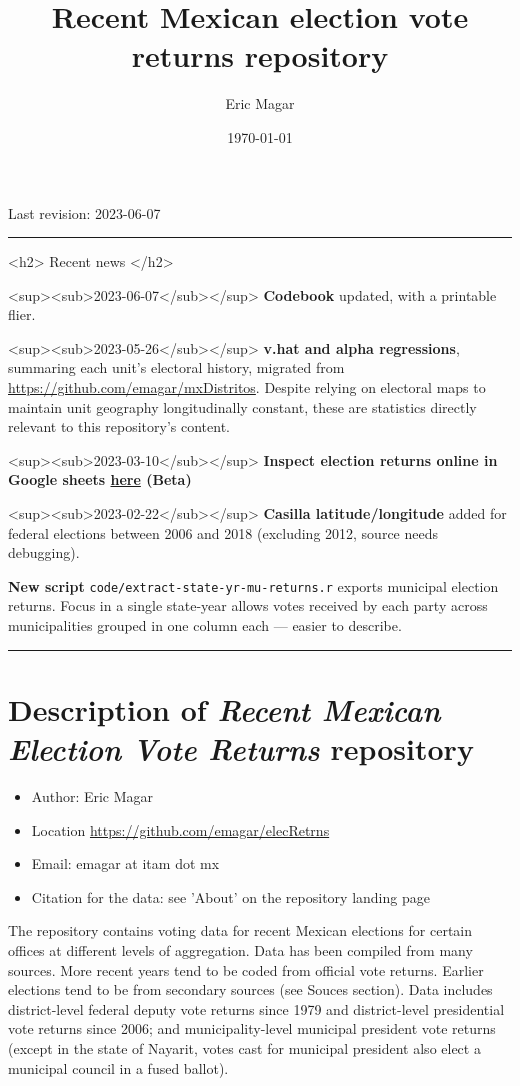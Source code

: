 \documentclass[11pt]{article}
\author{Eric Magar}
\date{\today}
\title{Recent Mexican election vote returns repository}
\begin{document}
\maketitle
\tableofcontents

Last revision: 2023-06-07

\noindent\rule{\textwidth}{0.5pt}

<h2>
Recent news
</h2>

<sup><sub>2023-06-07</sub></sup> \textbf{Codebook} updated, with a printable flier.

<sup><sub>2023-05-26</sub></sup> \textbf{v.hat and alpha regressions}, summaring each unit's electoral history, migrated from \url{https://github.com/emagar/mxDistritos}. Despite relying on electoral maps to maintain unit geography longitudinally constant, these are statistics directly relevant to this repository's content. 

<sup><sub>2023-03-10</sub></sup> \textbf{Inspect election returns online in Google sheets \href{https://emagar.github.io/view-in-gSheets/}{here} (Beta)}

<sup><sub>2023-02-22</sub></sup> \textbf{Casilla latitude/longitude} added for federal elections between 2006 and 2018 (excluding 2012, source needs debugging).

\textbf{New script} \texttt{code/extract-state-yr-mu-returns.r}  exports municipal election returns. Focus in a single state-year allows votes received by each party across municipalities grouped in one column each --- easier to describe.  

\noindent\rule{\textwidth}{0.5pt}

\section{Description of \emph{Recent Mexican Election Vote Returns} repository\label{org5520298}}
\label{sec:orgbb2f0a1}
\begin{itemize}
\item Author: Eric Magar
\item Location \url{https://github.com/emagar/elecRetrns}
\item Email: emagar at itam dot mx
\item Citation for the data: see 'About' on the repository landing page
\end{itemize}
The repository contains voting data for recent Mexican elections for certain offices at different levels of aggregation. Data has been compiled from many sources. More recent years tend to be coded from official vote returns. Earlier elections tend to be from secondary sources (see Souces section). Data includes district-level federal deputy vote returns since 1979 and district-level presidential vote returns since 2006; and municipality-level municipal president vote returns (except in the state of Nayarit, votes cast for municipal president also elect a municipal council in a fused ballot). 
\end{document}
